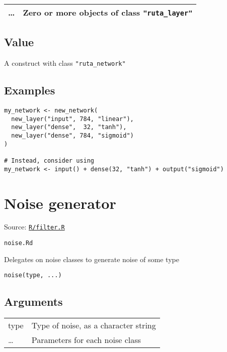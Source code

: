 \begin{longtable}[c]{@{}ll@{}}
\toprule
\ldots{} & Zero or more objects of class
\texttt{"ruta\_layer"}\tabularnewline
\bottomrule
\end{longtable}

\hypertarget{value}{\subsection{\texorpdfstring{\protect\hyperlink{value}{}Value}{Value}}\label{value}}

A construct with class \texttt{"ruta\_network"}

\hypertarget{examples}{\subsection{\texorpdfstring{\protect\hyperlink{examples}{}Examples}{Examples}}\label{examples}}

\begin{verbatim}
my_network <- new_network(
  new_layer("input", 784, "linear"),
  new_layer("dense",  32, "tanh"),
  new_layer("dense", 784, "sigmoid")
)

# Instead, consider using
my_network <- input() + dense(32, "tanh") + output("sigmoid")
\end{verbatim}

\section{Noise generator}\label{noise-generator}

Source:
\href{https://github.com/fdavidcl/ruta/blob/master/R/filter.R}{\texttt{R/filter.R}}

\texttt{noise.Rd}

Delegates on noise classes to generate noise of some type

\begin{verbatim}
noise(type, ...)
\end{verbatim}

\hypertarget{arguments}{\subsection{\texorpdfstring{\protect\hyperlink{arguments}{}Arguments}{Arguments}}\label{arguments}}

\begin{longtable}[c]{@{}ll@{}}
\toprule
type & Type of noise, as a character string\tabularnewline
\ldots{} & Parameters for each noise class\tabularnewline
\bottomrule
\end{longtable}

